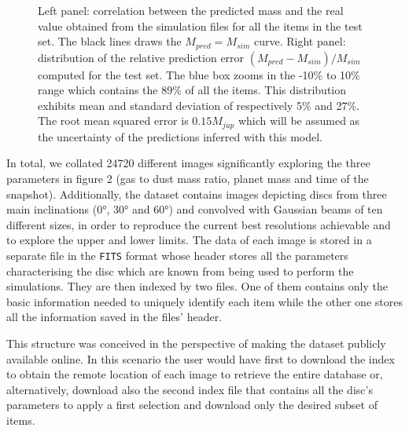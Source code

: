 \documentclass[a4paper,10pt, margin=1cm]{article}
\begin{document}
\begin{figure}
  \begin{center}
    \scalebox{0.85}{}
  \end{center}

  \caption{Left panel: correlation between the predicted mass and the real value obtained from the simulation files
    for all the items in the test set. The black lines draws the $M_{pred} = M_{sim}$ curve.
    Right panel: distribution of the relative prediction error $(M_{pred} - M_{sim})/M_{sim}$ 
        computed for the test set. The blue box 
    zooms in the -10\% to 10\% range which contains the 89\% of all the items. This distribution exhibits mean and standard 
    deviation of respectively 5\% and 27\%. The root mean squared error is $0.15 M_{jup}$ which will be assumed
    as the uncertainty of the predictions inferred with this model.}

\end{figure}

In total, we collated 24720 different images significantly exploring the three parameters in figure 2 (gas to dust mass ratio, planet mass and
time of the snapshot). Additionally, the dataset contains images depicting discs from three main inclinations (0°, 30° and 60°) and convolved 
with Gaussian beams of ten different sizes, in order to reproduce the current best resolutions achievable and to explore the upper and lower limits.
The data of each image is stored in a separate file in the \lstinline{FITS} format whose header stores all the parameters
characterising the disc which are known from being used to perform the simulations.
They are then indexed by two files. One of them contains only the basic information
needed to uniquely identify each item while the other one stores all the information saved in the files' header.

This structure was conceived in the perspective of making the dataset publicly available online.
In this scenario the user would have first to download the index to obtain the remote location
of each image to retrieve the entire database or, alternatively, download also the second index file
that contains all the disc's parameters to apply a first selection and download only the desired subset of items.
\end{document}
